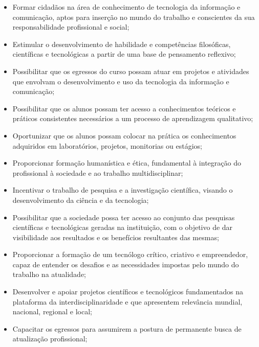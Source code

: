 \begin{itemize}

\item Formar cidadãos na área de conhecimento de tecnologia da informação e comunicação, aptos para inserção no mundo do trabalho e conscientes da sua responsabilidade profissional e social; 

\item Estimular o desenvolvimento de habilidade e competências filosóficas, científicas e tecnológicas a partir de uma base de pensamento reflexivo;

\item Possibilitar que os egressos do curso possam atuar em projetos e atividades que envolvam o desenvolvimento e uso da tecnologia da informação e comunicação;

\item Possibilitar que os alunos possam ter acesso a conhecimentos teóricos e práticos consistentes necessários a um processo de aprendizagem qualitativo;

\item Oportunizar que os alunos possam colocar na prática os conhecimentos adquiridos em laboratórios, projetos, monitorias ou estágios; 

\item Proporcionar formação humanística e ética, fundamental à integração do profissional à sociedade e ao trabalho multidisciplinar; 

\item Incentivar o trabalho de pesquisa e a investigação científica, visando o desenvolvimento da ciência e da tecnologia; 

\item Possibilitar que a sociedade possa ter acesso ao conjunto das pesquisas científicas e tecnológicas geradas na instituição, com o objetivo de dar visibilidade aos resultados e os benefícios resultantes das mesmas;

\item Proporcionar a formação de um tecnólogo crítico, criativo e empreendedor, capaz de entender os desafios e as necessidades impostas pelo mundo do trabalho na atualidade;

\item Desenvolver e apoiar projetos científicos e tecnológicos fundamentados na plataforma da interdisciplinaridade e que apresentem relevância mundial, nacional, regional e local;

\item Capacitar os egressos para assumirem a postura de permanente busca de atualização profissional;

\end{itemize}

